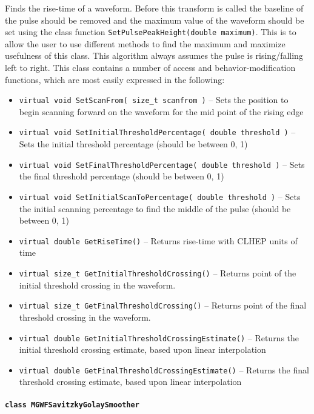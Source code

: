 Finds the rise-time of a waveform.  Before this transform is called the baseline of the pulse should be removed and the maximum value of the waveform should be set using the class function \lstinline!SetPulsePeakHeight(double maximum)!.  This is to allow the user to use different methods to find the maximum and maximize usefulness of this class. This algorithm always assumes the pulse is rising/falling left to right.  This class contains a number of access and behavior-modification functions, which are most easily expressed in the following:
				\begin{itemize} 
				    \item \lstinline!virtual void SetScanFrom( size_t scanfrom )! -- Sets the position to begin scanning forward on the waveform for the mid point of the rising edge
				    \item \lstinline!virtual void SetInitialThresholdPercentage( double threshold )! --     Sets the initial threshold percentage (should be between 0, 1)
				    \item \lstinline!virtual void SetFinalThresholdPercentage( double threshold )! --     Sets the final threshold percentage (should be between 0, 1)
				    \item \lstinline!virtual void SetInitialScanToPercentage( double threshold )! -- Sets the initial scanning percentage to find the middle of the pulse (should be between 0, 1)
				    \item \lstinline!virtual double GetRiseTime()! --     Returns rise-time with CLHEP units of time
				    \item \lstinline!virtual size_t GetInitialThresholdCrossing()! -- Returns point of the initial threshold crossing in the waveform.
				    \item \lstinline!virtual size_t GetFinalThresholdCrossing()! --     Returns point of the final threshold crossing in the waveform.
				    \item \lstinline!virtual double GetInitialThresholdCrossingEstimate()! --     Returns the initial threshold crossing estimate, based upon linear interpolation 
				    \item \lstinline!virtual double GetFinalThresholdCrossingEstimate()! -- Returns the final threshold crossing estimate, based upon linear interpolation 
				\end{itemize}				
			\paragraph{\lstinline!class MGWFSavitzkyGolaySmoother!} 

